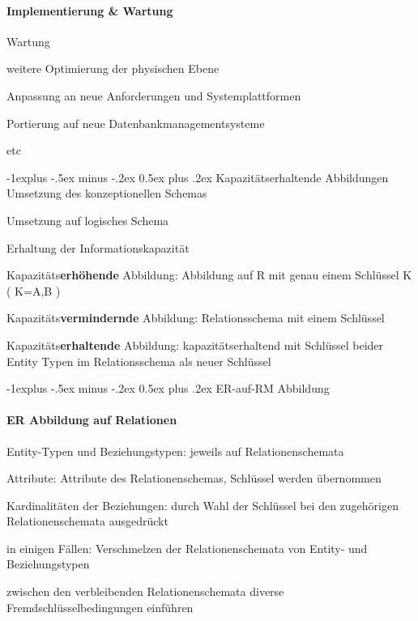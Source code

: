 \documentclass[a4paper]{article}
\makeatletter
\renewcommand{\subsection}{\@startsection{subsection}{2}{0mm}%
                                {-1explus -.5ex minus -.2ex}%
                                {0.5ex plus .2ex}%
                                {\normalfont\normalsize\bfseries}}
\makeatother
\begin{document}
\begin{multicols}{3}
\paragraph{Implementierung \& Wartung}
\begin{itemize*}
    \item Wartung
    \item weitere Optimierung der physischen Ebene
    \item Anpassung an neue Anforderungen und Systemplattformen
    \item Portierung auf neue Datenbankmanagementsysteme
    \item etc
\end{itemize*}


\subsection{Kapazitätserhaltende Abbildungen}
Umsetzung des konzeptionellen Schemas
\begin{itemize*}
    \item Umsetzung auf logisches Schema
    \item Erhaltung der Informationskapazität
    \item Kapazitäts\textbf{erhöhende} Abbildung: Abbildung auf R mit genau einem Schlüssel K ( K={{A},{B}} )
    \item Kapazitäts\textbf{vermindernde} Abbildung: Relationsschema mit einem Schlüssel
    \item Kapazitäts\textbf{erhaltende} Abbildung: kapazitätserhaltend mit Schlüssel beider Entity Typen im Relationsschema als neuer Schlüssel
\end{itemize*}

\subsection{ER-auf-RM Abbildung}
\paragraph{ER Abbildung auf Relationen}
\begin{itemize*}
    \item Entity-Typen und Beziehungstypen: jeweils auf Relationenschemata
    \item Attribute: Attribute des Relationenschemas, Schlüssel werden übernommen
    \item Kardinalitäten der Beziehungen: durch Wahl der Schlüssel bei den zugehörigen Relationenschemata ausgedrückt
    \item in einigen Fällen: Verschmelzen der Relationenschemata von Entity- und Beziehungstypen
    \item zwischen den verbleibenden Relationenschemata diverse Fremdschlüsselbedingungen einführen
\end{itemize*}


\end{multicols}
\end{document}
